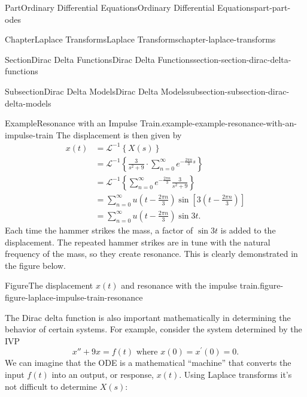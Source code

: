 \documentclass[twoside,10pt,]{book}
\numberwithin{equation}{part}
\newcommand{\Sum}[2]{\sum_{#1}^{#2}}
\newcommand{\iLaplace}[1]{\mathcal{L}^{-1}\set{#1}}
\newcommand{\set}[1]{\left\{ #1 \right\}}
\begin{document}
\begin{partptx}{Part}{Ordinary Differential Equations}{}{Ordinary Differential Equations}{}{}{part-part-odes}
\begin{chapterptx}{Chapter}{Laplace Transforms}{}{Laplace Transforms}{}{}{chapter-laplace-transforms}
\begin{sectionptx}{Section}{Dirac Delta Functions}{}{Dirac Delta Functions}{}{}{section-section-dirac-delta-functions}
\begin{subsectionptx}{Subsection}{Dirac Delta Models}{}{Dirac Delta Models}{}{}{subsection-subsection-dirac-delta-models}
\begin{example}{Example}{Resonance with an Impulse Train.}{example-example-resonance-with-an-impulse-train}
The displacement is then given by%
\begin{align*}
x(t) &= \iLaplace{X(s)}\\
&= \iLaplace{\frac{3}{s^{2}+9}\cdot\Sum{n=0}{\infty}e^{-\frac{2\pi n}{3}s}}\\
&= \iLaplace{\Sum{n=0}{\infty}e^{-\frac{2\pi n}{3}}\frac{3}{s^{2}+9}}\\
&= \Sum{n=0}{\infty}u(t-\frac{2\pi n}{3})\sin[3(t-\frac{2\pi n}{3})]\\
&= \Sum{n=0}{\infty}u(t-\frac{2\pi n}{3})\sin3t\text{.}
\end{align*}
Each time the hammer strikes the mass, a factor of \(\sin3t\) is added to the displacement. The repeated hammer strikes are in tune with the natural frequency of the mass, so they create resonance. This is clearly demonstrated in the figure below.%
\begin{figureptx}{Figure}{The displacement \(x(t)\) and resonance with the impulse train.}{figure-figure-laplace-impulse-train-resonance}{}%
\begin{image}{0.25}{0.5}{0.25}{}%
%
\end{image}%
\tcblower
\end{figureptx}%
\end{example}
\end{subsectionptx}
The Dirac delta function is also important mathematically in determining the behavior of certain systems. For example, consider the system determined by the IVP%
\begin{equation*}
x'' + 9x = f(t)\text{ where }x(0) = x^{\prime}(0) = 0.
\end{equation*}
We can imagine that the ODE is a mathematical ``machine'' that converts the input \(f(t)\) into an output, or response, \(x(t)\). Using Laplace transforms it's not difficult to determine \(X(s)\):%
\begin{equation*}

\end{equation*}
\end{sectionptx}
\end{chapterptx}
\end{partptx}
\end{document}
